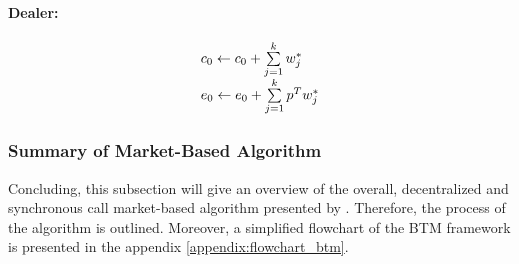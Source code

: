 \paragraph*{Dealer:}
\begin{equation*}
 \begin{array}{ll@{}ll}
 c_{0} \leftarrow c_{0} + \sum\limits_{j=1}^{k} w_{j}^{*} \\
 e_{0} \leftarrow e_{0} + \sum\limits_{j=1}^{k} p^{T} w_{j}^{*} \\
 \end{array}
\end{equation*}


\subsubsection{Summary of Market-Based Algorithm}
\label{sec:summary_of_btm}
Concluding, this subsection will give an overview of the overall, decentralized and synchronous
call market-based algorithm presented by . 
Therefore, the process of the algorithm is outlined.
Moreover, a simplified flowchart of the BTM 
framework is presented in the appendix \ref{appendix:flowchart_btm}.

